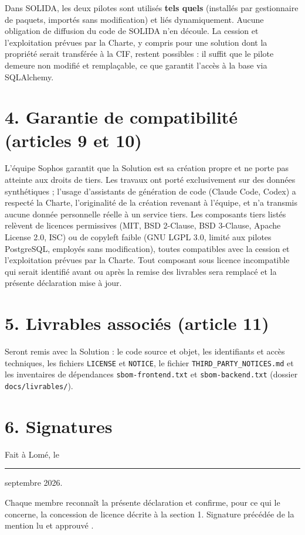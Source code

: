 \documentclass[11pt,a4paper]{article}
\begin{document}
Dans SOLIDA, les deux pilotes sont utilisés \textbf{tels quels} (installés par gestionnaire de
paquets, importés sans modification) et liés dynamiquement. Aucune obligation de diffusion du code
de SOLIDA n'en découle. La cession et l'exploitation prévues par la Charte, y compris pour une
solution dont la propriété serait transférée à la CIF, restent possibles : il suffit que le pilote
demeure non modifié et remplaçable, ce que garantit l'accès à la base via SQLAlchemy.

\section*{4. Garantie de compatibilité (articles 9 et 10)}

L'équipe Sophos garantit que la Solution est sa création propre et ne porte pas atteinte aux
droits de tiers. Les travaux ont porté exclusivement sur des données synthétiques ; l'usage
d'assistants de génération de code (Claude Code, Codex) a respecté la Charte, l'originalité de la
création revenant à l'équipe, et n'a transmis aucune donnée personnelle réelle à un service tiers. Les composants tiers listés relèvent de licences
permissives (MIT, BSD 2-Clause, BSD 3-Clause, Apache License 2.0, ISC) ou de copyleft faible
(GNU LGPL 3.0, limité aux pilotes PostgreSQL, employés sans modification), toutes compatibles avec
la cession et l'exploitation prévues par la Charte. Tout composant sous licence incompatible qui
serait identifié avant ou après la remise des livrables sera remplacé et la présente déclaration
mise à jour.

\section*{5. Livrables associés (article 11)}

Seront remis avec la Solution : le code source et objet, les identifiants et accès techniques, les
fichiers \texttt{LICENSE} et \texttt{NOTICE}, le fichier \texttt{THIRD\_PARTY\_NOTICES.md} et les
inventaires de dépendances \texttt{sbom-frontend.txt} et \texttt{sbom-backend.txt} (dossier
\texttt{docs/livrables/}).

\section*{6. Signatures}

Fait à Lomé, le \rule{2.2cm}{0.4pt} septembre 2026.

\smallskip
\noindent Chaque membre reconnaît la présente déclaration et confirme, pour ce qui le concerne, la
concession de licence décrite à la section 1. Signature précédée de la mention \og lu et approuvé \fg{}.
\end{document}
